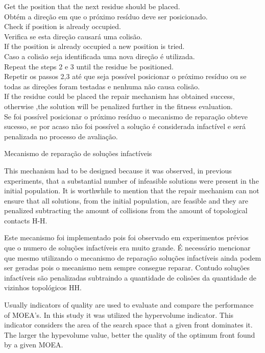 \documentclass[conference]{IEEEtran}
\begin{document}
\begin{algorithm}[h]
	\label{algo:reparacao}
	Get the position that the next residue should be placed. \\
	Obtém a direção em que o próximo resíduo deve ser posicionado.\\
	Check if position is already occupied.\\
	Verifica se esta direção causará uma colisão.\\
	If the position is already occupied a new position is tried.\\
	Caso a colisão seja identificada uma nova direção é utilizada.\\
	Repeat the steps 2 e 3 until the residue be positioned. \\
	Repetir os passos 2,3 até que seja possível posicionar o próximo resíduo ou se todas as direções foram testadas e nenhuma não causa colisão.\\
	If the residue could be placed the repair mechanism has obtained success, otherwise ,the solution will be penalized further in the fitness evaluation.\\
	Se foi possível posicionar o próximo resíduo o mecanismo de reparação obteve sucesso, se por acaso não foi possível a solução é considerada infactível e será penalizada no processo de avaliação.
	\caption{Mecanismo de reparação de soluções infactíveis}
\end{algorithm}


This mechanism had to be designed because it was observed, in previous experiments, that a substantial number of infeasible solutions were present in the initial population. It is worthwhile to mention that the repair mechanism can not ensure that all solutions, from the initial population, are feasible and they are penalized subtracting the amount of collisions from the amount of topological contacts H-H. 

Este mecanismo foi implementado pois foi observado em experimentos prévios que o numero de soluções infactíveis era muito grande. É necessário mencionar que mesmo utilizando o mecanismo de reparação soluções infactíveis ainda podem ser geradas pois o mecanismo nem sempre consegue reparar. Contudo soluções infactíveis são penalizadas subtraindo a quantidade de colisões da quantidade de vizinhos topológicos HH.

Usually indicators of quality are used to evaluate and compare the performance of MOEA's. In this study it was utilized the hypervolume indicator. This indicator considers the area of the search space that a given front dominates it. The larger the hypevolume value, better the quality of the optimum front found by a given MOEA.
\end{document}
